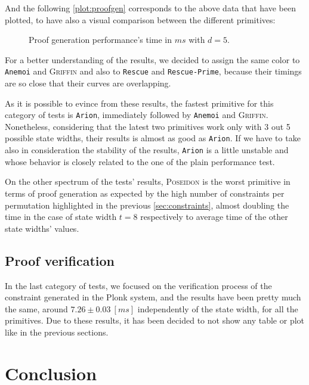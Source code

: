\documentclass[12pt, a4paper]{report}
\begin{document}
And the following \autoref{plot:proofgen} corresponds to the above data that have been plotted, to have also a visual comparison between the different primitives:

\begin{figure}[H]
  \hspace{60pt}
  \caption{Proof generation performance's time in $ms$ with $d = 5$.}\label{plot:proofgen}
\end{figure}

For a better understanding of the results, we decided to assign the same color to \texttt{Anemoi} and \textsc{Griffin} and also to \texttt{Rescue} and \texttt{Rescue-Prime}, because their timings are so close that their curves are overlapping.

As it is possible to evince from these results, the fastest primitive for this category of tests is \texttt{Arion}, immediately followed by \texttt{Anemoi} and \textsc{Griffin}.
Nonetheless, considering that the latest two primitives work only with 3 out 5 possible state widths, their results is almost as good as \texttt{Arion}.
If we have to take also in consideration the stability of the results, \texttt{Arion} is a little unstable and whose behavior is closely related to the one of the plain performance test.

On the other spectrum of the tests' results, \textsc{Poseidon} is the worst primitive in terms of proof generation as expected by the high number of constraints per permutation highlighted in the previous \autoref{sec:constraints}, almost doubling the time in the case of state width $t = 8$ respectively to average time of the other state widths' values.

\section{Proof verification}\label{sec:proofver}

In the last category of tests, we focused on the verification process of the constraint generated in the Plonk system, and the results have been pretty much the same, around $7.26\pm0.03\ [ms]$ independently of the state width, for all the primitives.
Due to these results, it has been decided to not show any table or plot like in the previous sections.

\chapter{Conclusion}\label{chap:conclusion}
\end{document}
